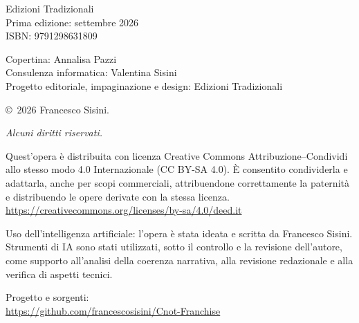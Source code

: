 \documentclass[10pt,oneside]{extbook}
\begin{document}
\clearpage{}\clearpage
\thispagestyle{empty}
\vfill
\vspace*{7cm}
\begin{flushleft}
\scriptsize

Edizioni Tradizionali\\
\medskip
\noindent Prima edizione: settembre 2026\\
ISBN: 9791298631809\par

\medskip
\noindent Copertina: Annalisa Pazzi\\
Consulenza informatica: Valentina Sisini\\
Progetto editoriale, impaginazione e design: Edizioni Tradizionali\par

\medskip
\noindent\copyright\ 2026 Francesco Sisini.\par
\textit{Alcuni diritti riservati.}\par

\medskip
\noindent Quest'opera \`e distribuita con licenza
Creative Commons Attribuzione--Condividi allo stesso modo 4.0 Internazionale
(CC BY-SA 4.0). \`E consentito condividerla e adattarla, anche per scopi
commerciali, attribuendone correttamente la paternità e distribuendo le opere
derivate con la stessa licenza.\\
\url{https://creativecommons.org/licenses/by-sa/4.0/deed.it}\par

\medskip
\noindent Uso dell'intelligenza artificiale:
l'opera \`e stata ideata e scritta da Francesco Sisini. Strumenti di IA sono stati
utilizzati, sotto il controllo e la revisione dell'autore, come supporto
all'analisi della coerenza narrativa, alla revisione redazionale e alla verifica
di aspetti tecnici.\par

\medskip
\noindent Progetto e sorgenti:\\
\url{https://github.com/francescosisini/Cnot-Franchise}\par
\end{flushleft}
\clearpage{}
\end{document}
